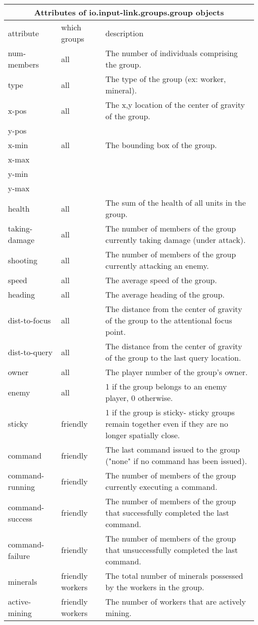 \begin{center}
\begin{tabular}{|l|l|p{3.5in}|}
\hline
\multicolumn{3}{|c|}{\textbf{Attributes of io.input-link.groups.group objects}}\\ 
\hline
attribute  & which groups &  description\\
\hline \hline
num-members & all & The number of individuals comprising the group. \\
\hline
type & all &The type of the group (ex: worker, mineral). \\
\hline
x-pos & all &The x,y location of the center of gravity of the group.\\
y-pos & & \\
\hline
x-min & all &The bounding box of the group.\\
x-max & & \\
y-min & & \\
y-max & & \\
\hline
health & all &The sum of the health of all units in the group.\\
\hline
taking-damage & all &The number of members of the group currently taking damage (under attack). \\
\hline
shooting & all &The number of members of the group currently attacking an enemy. \\
\hline
speed & all &The average speed of the group. \\
\hline
heading & all &The average heading of the group. \\
\hline
dist-to-focus & all &The distance from the center of gravity of the group to the attentional focus point.\\
\hline
dist-to-query & all &The distance from the center of gravity of the group to the last query location.\\
\hline
owner & all &The player number of the group's owner.\\
\hline
enemy & all &1 if the group belongs to an enemy player, 0 otherwise.\\
\hline
sticky & friendly & 1 if the group is sticky- sticky groups remain together even if they are no longer spatially close.\\
\hline
command & friendly & The last command issued to the group ("none" if no command has been issued).\\
\hline
command-running & friendly & The number of members of the group currently executing a command.\\
\hline
command-success & friendly & The number of members of the group that successfully completed the last command.\\
\hline
command-failure & friendly & The number of members of the group that unsuccessfully completed the last command.\\
\hline
minerals & friendly workers & The total number of minerals possessed by the workers in the group.\\
\hline
active-mining & friendly workers & The number of workers that are actively mining.\\
\hline
\end{tabular}
\end{center}

